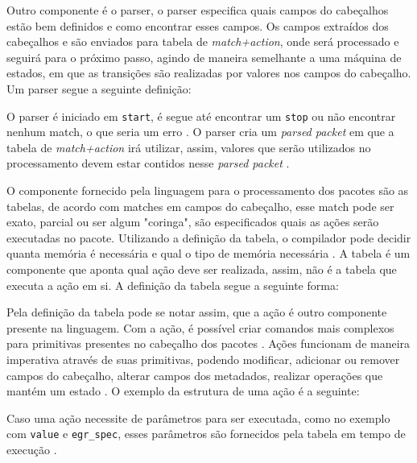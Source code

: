 \documentclass[12pt,
openright, 
oneside,
a4paper,
brazil]{facom-ufu-abntex2}
\theoremstyle{definition}
\begin{document}


Outro componente é o parser, o parser especifica quais campos do cabeçalhos estão
bem definidos e como encontrar esses campos. Os campos extraídos dos cabeçalhos e 
são enviados para tabela de \textit{match+action}, onde será processado e seguirá
para o próximo passo, agindo de maneira semelhante a uma máquina de estados, em 
que as transições são realizadas por valores nos campos do cabeçalho. Um parser
segue a seguinte definição:



O parser é iniciado em \texttt{start}, é segue até encontrar um \texttt{stop} ou não
encontrar nenhum match, o que seria um erro \citep{bosshart2014p4}. O parser cria um 
\textit{parsed packet} em que a tabela de \textit{match+action} irá utilizar,
assim, valores que serão utilizados no processamento devem estar contidos nesse
\textit{parsed packet} \citep{p4USITutorial}.

O componente fornecido pela linguagem para o processamento dos pacotes são as tabelas,
de acordo com matches em campos do cabeçalho, esse match  pode ser exato, parcial 
ou ser algum "coringa", são especificados quais as ações serão executadas no
pacote. Utilizando a definição da tabela, o compilador pode decidir quanta memória 
é necessária e qual o tipo de memória necessária \citep{bosshart2014p4}. A
tabela é um componente que aponta qual ação deve ser realizada, assim, não é a 
tabela que executa a ação em si. A definição da tabela segue a seguinte forma:



Pela definição da tabela pode se notar assim, que a ação é outro componente presente
na linguagem. Com a ação, é possível criar comandos mais complexos para primitivas
presentes no cabeçalho dos pacotes \citep{bosshart2014p4}. Ações funcionam de
maneira imperativa através de suas primitivas, podendo modificar, adicionar ou 
remover campos do cabeçalho, alterar campos dos metadados, realizar operações
que mantém um estado \citep{p4USITutorial}. O exemplo da estrutura de uma ação
é a seguinte:



Caso uma ação necessite de parâmetros para ser executada, como no exemplo com
\texttt{value} e \texttt{egr\_spec}, esses parâmetros são fornecidos pela tabela em tempo 
de execução \citep{bosshart2014p4}.
\end{document}
